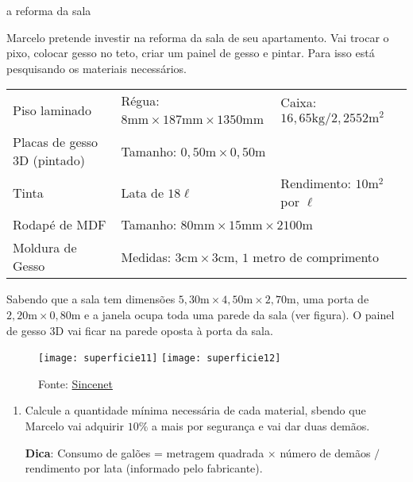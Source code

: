 \begin{task}{a reforma da sala}

Marcelo pretende investir na reforma da sala de seu apartamento. Vai trocar o pixo, colocar gesso no teto, criar um painel de gesso e pintar. Para isso está pesquisando os materiais necessários.

\begin{table}[H]
\centering
\setlength\tabcolsep{3pt}
\begin{tabular}{|l|ll|}
\hline
Piso laminado & Régua: $8\text{mm}\times187\text{mm}\times 1350$mm & Caixa: $16{,}65\text{kg}/2{,}2552\text{m}^2$ \\

Placas de gesso 3D (pintado) & Tamanho: $0{,}50\text{m}\times0{,}50\text{m}$ & \\

Tinta & Lata de $18\ell$ & Rendimento: $10\text{m}^2$ por $\ell$ \\

Rodapé de MDF & \multicolumn{2}{l|}{Tamanho: $80\text{mm}\times15\text{mm}\times2100\text{m}$} \\

Moldura de Gesso & \multicolumn{2}{l|}{Medidas: $3\text{cm}\times3\text{cm}$, $1$ metro de comprimento} \\
\hline
\end{tabular}
\end{table}



Sabendo que a sala tem dimensões $5{,}30\text{m}\times4{,}50\text{m}\times2{,}70\text{m}$, uma porta de $2{,}20\text{m}\times0{,}80\text{m}$ e a janela ocupa toda uma parede da sala (ver figura). O painel de gesso 3D vai ficar na parede oposta à porta da sala.

\begin{figure}[H]
\centering

\texttt{[image: superficie11]}\hspace{1cm}
\texttt{[image: superficie12]}

\caption{Fonte: \href{https://blog.sincenet.com.br/como-calcular/}{Sincenet}}
\end{figure}

\begin{enumerate}
  \item Calcule a quantidade mínima necessária de cada material, sbendo que Marcelo vai adquirir $10\%$ a mais por segurança e vai dar duas demãos.

  \textbf{Dica}: Consumo de galões = metragem quadrada $\times$ número de demãos $/$ rendimento por lata (informado pelo fabricante).


\end{enumerate}
\end{task}
